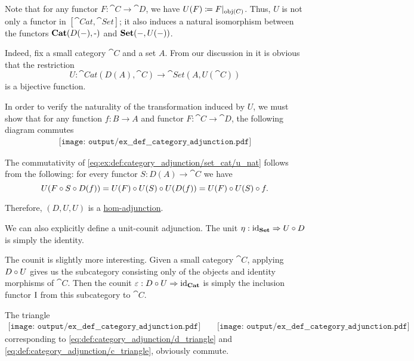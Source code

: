 \begin{example}
\begin{thmenum}
    Note that for any functor \( F: \cat{C} \to \cat{D} \), we have \( U(F) \coloneqq F\vert_{\operatorname{obj}(C)} \). Thus, \( U \) is not only a functor in \( [\cat{Cat}, \cat{Set}] \); it also induces a natural isomorphism between the functors \( \cat{Cat}(D(\anon*), \cat{\anon*}) \) and \( \cat{Set}(\anon*, U(\anon*)) \).

    Indeed, fix a small category \( \cat{C} \) and a set \( A \). From our discussion in  it is obvious that the restriction
    \begin{equation*}
      U: \cat{Cat}(D(A), \cat{C}) \to \cat{Set}(A, U(\cat{C}))
    \end{equation*}
    is a bijective function.

    In order to verify the naturality of the transformation induced by \( U \), we must show that for any function \( f: B \to A \) and functor \( F: \cat{C} \to \cat{D} \), the following diagram commutes
    \begin{equation}\label{eq:ex:def:category_adjunction/set_cat/u_nat}
      \begin{aligned}
        \texttt{[image: output/ex\_\_def\_\_category\_adjunction.pdf]}
      \end{aligned}
    \end{equation}

    The commutativity of \eqref{eq:ex:def:category_adjunction/set_cat/u_nat} follows from the following: for every functor \( S: D(A) \to \cat{C} \) we have
    \begin{equation*}
      U(F \bincirc S \bincirc D(f))
      =
      U(F) \bincirc U(S) \bincirc U(D(f))
      =
      U(F) \bincirc U(S) \bincirc f.
    \end{equation*}

    Therefore, \( (D, U, U) \) is a \hyperref[def:category_adjunction/hom]{hom-adjunction}.

    We can also explicitly define a unit-counit adjunction. The unit \( \eta: \id_{\cat{Set}} \Rightarrow U \bincirc D \) is simply the identity.

    The counit is slightly more interesting. Given a small category \( \cat{C} \), applying \( D \bincirc U \) gives us the subcategory consisting only of the objects and identity morphisms of \( \cat{C} \). Then the counit \( \varepsilon: D \bincirc U \Rightarrow \id_{\cat{Cat}} \) is simply the inclusion functor \( \operatorname{I} \) from this subcategory to \( \cat{C} \).

    The triangle
    \begin{equation}\label{eq:ex:def:category_adjunction/set_cat/triangles}
      \begin{aligned}
        \texttt{[image: output/ex\_\_def\_\_category\_adjunction.pdf]}
        \quad\quad
        \texttt{[image: output/ex\_\_def\_\_category\_adjunction.pdf]}
      \end{aligned}
    \end{equation}
    corresponding to \eqref{eq:def:category_adjunction/d_triangle} and \eqref{eq:def:category_adjunction/c_triangle}, obviously commute.


\end{thmenum}
\end{example}
